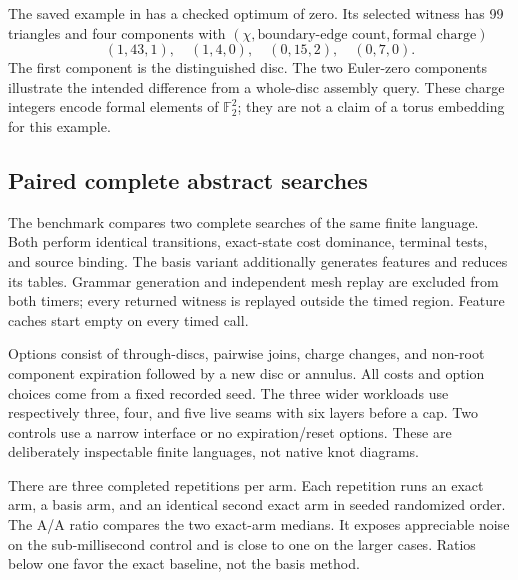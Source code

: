 \documentclass[11pt,letterpaper]{article}
\theoremstyle{definition}
\newcommand{\F}{\mathbb F}
\begin{document}
The saved example in  has a checked optimum of zero. Its selected witness has 99 triangles and four components with $(\chi,\text{boundary-edge count},\text{formal charge})$
\[
 (1,43,1),\quad(1,4,0),\quad(0,15,2),\quad(0,7,0).
\]
The first component is the distinguished disc. The two Euler-zero components illustrate the intended difference from a whole-disc assembly query. These charge integers encode formal elements of $\F_2^2$; they are not a claim of a torus embedding for this example.

\subsection{Paired complete abstract searches}
The benchmark compares two complete searches of the same finite language. Both perform identical transitions, exact-state cost dominance, terminal tests, and source binding. The basis variant additionally generates features and reduces its tables. Grammar generation and independent mesh replay are excluded from both timers; every returned witness is replayed outside the timed region. Feature caches start empty on every timed call.

Options consist of through-discs, pairwise joins, charge changes, and non-root component expiration followed by a new disc or annulus. All costs and option choices come from a fixed recorded seed. The three wider workloads use respectively three, four, and five live seams with six layers before a cap. Two controls use a narrow interface or no expiration/reset options. These are deliberately inspectable finite languages, not native knot diagrams.

There are three completed repetitions per arm. Each repetition runs an exact arm, a basis arm, and an identical second exact arm in seeded randomized order. The A/A ratio compares the two exact-arm medians. It exposes appreciable noise on the sub-millisecond control and is close to one on the larger cases. Ratios below one favor the exact baseline, not the basis method.

\begin{table}[ht]
\centering\small
\caption{Median wall times from completed runs. Ratio is exact divided by basis; A/A compares identical exact algorithms.}\label{tab:timing}
\end{table}
\begin{table}[ht]
\centering\small
\caption{Machine-independent work and retained-state counts for the same runs. ``Peak'' counts candidates after each route's reductions.}\label{tab:states}
\end{table}
\end{document}
